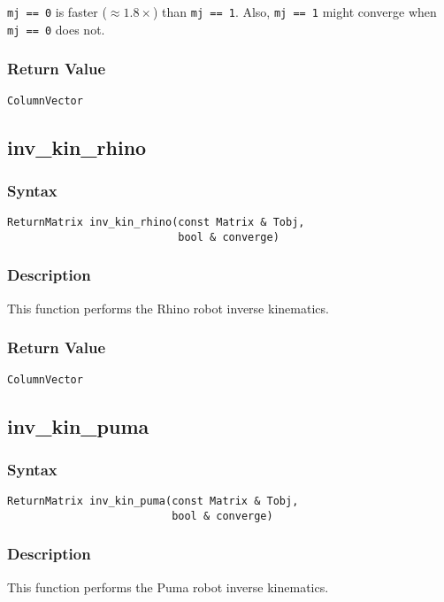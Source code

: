 \documentclass[dvips,11pt,fleqn]{report}
\begin{document}
 {\tt mj == 0} is faster ($\approx 1.8\times$) than {\tt mj == 1}. 
Also, {\tt mj == 1} might converge when {\tt mj == 0} does not.

\subsubsection*{Return Value}

{\tt ColumnVector}

\newpage

\subsection*{inv\_kin\_rhino}
\subsubsection*{Syntax}
\begin{verbatim}
ReturnMatrix inv_kin_rhino(const Matrix & Tobj, 
                           bool & converge)
\end{verbatim}
\subsubsection*{Description}
This function performs the Rhino robot inverse kinematics.

\subsubsection*{Return Value}

{\tt ColumnVector}

\newpage

\subsection*{inv\_kin\_puma}
\subsubsection*{Syntax}
\begin{verbatim}
ReturnMatrix inv_kin_puma(const Matrix & Tobj, 
                          bool & converge)
\end{verbatim}
\subsubsection*{Description}
This function performs the Puma robot inverse kinematics.
\end{document}
